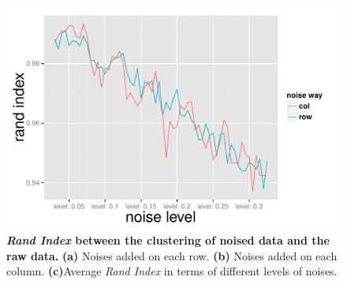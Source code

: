 \begin{figure}
\begin{minipage}[t]{0.34\textwidth}
    \centering
    \includegraphics[width=\textwidth,height=0.8\textwidth]{fig/noise_line.pdf}
    \subcaption{}
  \end{minipage}
  \caption{\textbf{\textit{Rand Index} between the clustering of noised data and the raw data.} \textbf{(a)} Noises added on each row. \textbf{(b)}  Noises added on each column. \textbf{(c)}Average \textit{Rand Index} in terms of different levels of noises.}
  \label{fig:perturbation}
\end{figure}

